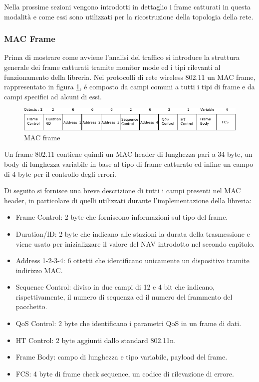 Nella prossime sezioni vengono introdotti in dettaglio i frame catturati in questa modalit\`a e come essi sono utilizzati per la ricostruzione della topologia della rete.

\subsubsection{MAC Frame}

Prima di mostrare come avviene l'analisi del traffico si introduce la struttura generale dei frame catturati tramite monitor mode ed i tipi rilevanti al funzionamento della libreria.
Nei protocolli di rete wireless 802.11 un MAC frame, rappresentato in figura \ref{fig:macframe}, \'e composto da campi comuni a tutti i tipi di frame e da campi specifici ad alcuni di essi.

\begin{figure}[!htb]
	\centering
	\includegraphics{images/img5.pdf}
	\caption{MAC frame}
	\label{fig:macframe}
\end{figure}

Un frame 802.11 contiene quindi un MAC header di lunghezza pari a 34 byte, un body di lunghezza variabile in base al tipo di frame catturato ed infine un campo di 4 byte per il controllo degli errori.

Di seguito si fornisce una breve descrizione di tutti i campi presenti nel MAC header, in particolare di quelli utilizzati durante l'implementazione della libreria:

\newpage

\begin{itemize}
	\item Frame Control: 2 byte che forniscono informazioni sul tipo del frame.
	\item Duration/ID: 2 byte che indicano alle stazioni la durata della trasmessione e viene usato per inizializzare il valore del NAV introdotto nel secondo capitolo.
	\item Address 1-2-3-4: 6 ottetti che identificano unicamente un dispositivo tramite   indirizzo MAC.
	\item Sequence Control: diviso in due campi di 12 e 4 bit che indicano, rispettivamente, il numero di sequenza ed il numero del frammento del pacchetto.
	\item QoS Control: 2 byte che identificano i parametri QoS in un frame di dati.
	\item HT Control: 2 byte aggiunti dallo standard 802.11n.
	\item Frame Body: campo di lunghezza e tipo variabile, payload del frame.
	\item FCS: 4 byte di frame check sequence, un codice di rilevazione di errore.
\end{itemize}

